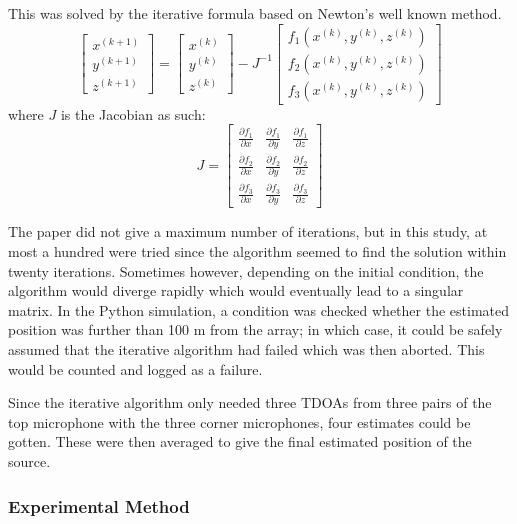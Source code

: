 \documentclass[notitlepage]{report}
\begin{document}
This was solved by the iterative formula based on Newton's well known method.
\begin{equation}
\begin{bmatrix}
	x^{(k+1)} \\
	y^{(k+1)} \\
	z^{(k+1)}
\end{bmatrix}
=
\begin{bmatrix}
	x^{(k)} \\
	y^{(k)} \\
	z^{(k)}
\end{bmatrix}
-
J^{-1}
\begin{bmatrix}
	f_1\left(x^{(k)}, y^{(k)}, z^{(k)}\right) \\
	f_2\left(x^{(k)}, y^{(k)}, z^{(k)}\right) \\
	f_3\left(x^{(k)}, y^{(k)}, z^{(k)}\right)
\end{bmatrix}
\end{equation}
where $J$ is the Jacobian as such:
\begin{equation}
J = 
\begin{bmatrix}
\frac{\partial f_1}{\partial x}
& \frac{\partial f_1}{\partial y}
& \frac{\partial f_1}{\partial z} \\
\frac{\partial f_2}{\partial x}
& \frac{\partial f_2}{\partial y}
& \frac{\partial f_2}{\partial z} \\
\frac{\partial f_3}{\partial x}
& \frac{\partial f_3}{\partial y}
& \frac{\partial f_3}{\partial z}
\end{bmatrix}
\end{equation}

The paper did not give a maximum number of iterations, but in this study, at most a hundred were tried since the algorithm seemed to find the solution within twenty iterations. Sometimes however, depending on the initial condition, the algorithm would diverge rapidly which would eventually lead to a singular matrix. In the Python simulation, a condition was checked whether the estimated position was further than 100 \si{m} from the array; in which case, it could be safely assumed that the iterative algorithm had failed which was then aborted. This would be counted and logged as a failure.

Since the iterative algorithm only needed three TDOAs from three pairs of the top microphone with the three corner microphones, four estimates could be gotten. These were then averaged to give the final estimated position of the source.

\subsubsection{Experimental Method}
\end{document}
